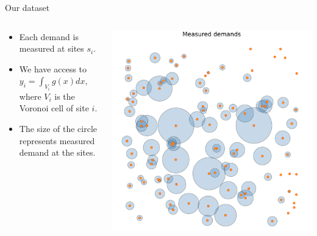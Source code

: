 \documentclass[aspectratio=169]{beamer}
\begin{document}
\begin{frame}{Our dataset}
	\begin{columns}
		\begin{column}{0.5\textwidth}
			\begin{itemize}
				\item Each demand is measured at sites $s_i$.
				\vspace{1cm}
				\item We have access to $y_i = \int_{V_i} g(x)dx$, where $V_i$ is the Voronoi cell of site $i$.
				\vspace{1cm}
				\item The size of the circle represents measured demand at the sites.
			\end{itemize}
		\end{column}
		\begin{column}{0.5\textwidth}
			\centering
			\includegraphics[width=0.9\columnwidth]{figuras/measured_demands.pdf}
		\end{column}
	\end{columns}

\end{frame}
\end{document}
